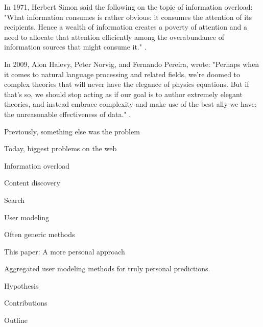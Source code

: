 In 1971, Herbert Simon said the following on the topic of information overload: 
"What information consumes is rather obvious: it consumes the attention of its recipients. 
Hence a wealth of information creates a poverty of attention and 
a need to allocate that attention efficiently among the overabundance of 
information sources that might consume it." \cite{Greenberger1971}.


In 2009, Alon Halevy, Peter Norvig, and Fernando Pereira, wrote:
"Perhaps when it comes to natural language processing and related fields, 
we’re doomed to complex theories that will never have the elegance of physics equations. 
But if that’s so, we should stop acting as if our goal is to author extremely elegant theories, 
and instead embrace complexity and make use of the best ally we have: 
the unreasonable effectiveness of data."
\cite{Halevy2009}.





Previously, something else was the problem

Today, biggest problems on the web

Information overload

Content discovery

Search

User modeling

Often generic methods

This paper: A more personal approach

Aggregated user modeling methods for 
truly personal predictions.

Hypothesis

Contributions

Outline


